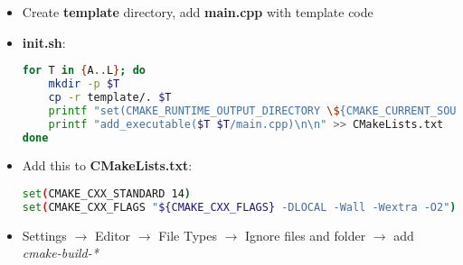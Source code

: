 \begin{itemize}

    \item Create \textbf{template} directory, add \textbf{main.cpp} with template code

    \item \textbf{init.sh}:
\begin{lstlisting}[language=bash]
for T in {A..L}; do
    mkdir -p $T
    cp -r template/. $T
    printf "set(CMAKE_RUNTIME_OUTPUT_DIRECTORY \${CMAKE_CURRENT_SOURCE_DIR}/$T)\n" >> CMakeLists.txt
    printf "add_executable($T $T/main.cpp)\n\n" >> CMakeLists.txt
done
\end{lstlisting}

\item Add this to \textbf{CMakeLists.txt}:
\begin{lstlisting}[language=bash]
set(CMAKE_CXX_STANDARD 14)
set(CMAKE_CXX_FLAGS "${CMAKE_CXX_FLAGS} -DLOCAL -Wall -Wextra -O2")
\end{lstlisting}

\item Settings $\to$ Editor $\to$ File Types $\to$ Ignore files and folder $\to$ add \textit{cmake-build-*}

\end{itemize}
